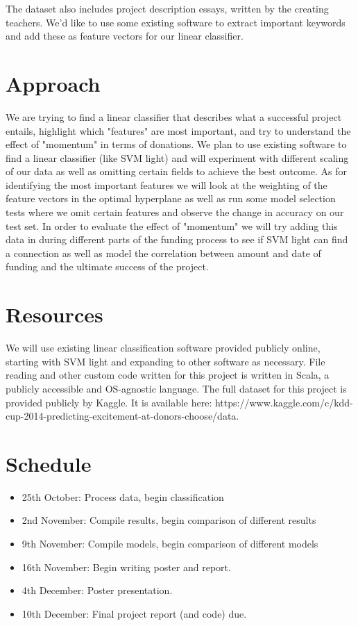 \documentclass{article}
\begin{document}
The dataset also includes project description essays, written by the creating teachers. We'd like to use some existing software to extract important keywords and add these as feature vectors for our linear classifier.
\section{Approach}

We are trying to find a linear classifier that describes what a successful project entails, highlight which "features" are most important, and try to understand the effect of "momentum" in terms of donations.  We plan to use existing software to find a linear classifier (like SVM light) and will experiment with different scaling of our data as well as omitting certain fields to achieve the best outcome.  As for identifying the most important features we will look at the weighting of the feature vectors in the optimal hyperplane as well as run some model selection tests where we omit certain features and observe the change in accuracy on our test set.  In order to evaluate the effect of "momentum" we will try adding this data in during different parts of the funding process to see if SVM light can find a connection as well as model the correlation between amount and date of funding and the ultimate success of the project. 

\section{Resources}
We will use existing linear classification software provided publicly online, starting with SVM light and expanding to other software as necessary. File reading and other custom code written for this project is written in Scala, a publicly accessible and OS-agnostic language. The full dataset for this project is provided publicly by Kaggle. It is available here: https://www.kaggle.com/c/kdd-cup-2014-predicting-excitement-at-donors-choose/data. 
\section{Schedule}

\begin{itemize}
\item 25th October: Process data, begin classification
\item 2nd November: Compile results, begin comparison of different results
\item 9th November: Compile models, begin comparison of different models
\item 16th November: Begin writing poster and report.
\item 4th December: Poster presentation.
\item 10th December: Final project report (and code) due.
\end{itemize}
\end{document}
